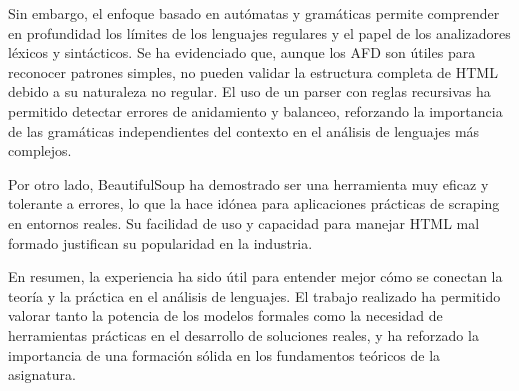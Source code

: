 \documentclass[11pt,a4paper]{article}
\begin{document}
\medskip

Sin embargo, el enfoque basado en autómatas y gramáticas permite comprender en profundidad los límites de los lenguajes regulares y el papel de los analizadores léxicos y sintácticos. Se ha evidenciado que, aunque los AFD son útiles para reconocer patrones simples, no pueden validar la estructura completa de HTML debido a su naturaleza no regular. El uso de un parser con reglas recursivas ha permitido detectar errores de anidamiento y balanceo, reforzando la importancia de las gramáticas independientes del contexto en el análisis de lenguajes más complejos.

\medskip

Por otro lado, BeautifulSoup ha demostrado ser una herramienta muy eficaz y tolerante a errores, lo que la hace idónea para aplicaciones prácticas de scraping en entornos reales. Su facilidad de uso y capacidad para manejar HTML mal formado justifican su popularidad en la industria.

\medskip

En resumen, la experiencia ha sido útil para entender mejor cómo se conectan la teoría y la práctica en el análisis de lenguajes. El trabajo realizado ha permitido valorar tanto la potencia de los modelos formales como la necesidad de herramientas prácticas en el desarrollo de soluciones reales, y ha reforzado la importancia de una formación sólida en los fundamentos teóricos de la asignatura.

\vspace{1em}
\end{document}
